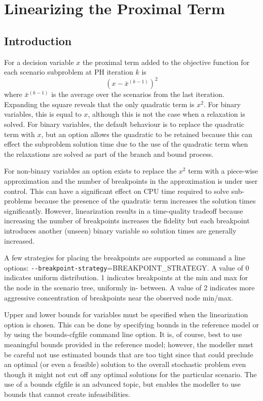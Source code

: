 \section{Linearizing the Proximal Term \label{LinearSec}}

\subsection{Introduction}

For a decision variable $x$ the proximal term added to the objective function for each scenario subproblem at PH iteration $k$ is
$$
\left(x - \bar{x}^{(k-1)}\right)^{2}
$$
where $\bar{x}^{(k-1)}$ is the average over the scenarios from the last iteration. Expanding the square reveals that the only
quadratic term is $x^{2}$. For binary variables, this is equal to $x$, although this is not the case when a relaxation is solved.
For binary variables, the default behaviour is to replace the quadratic term with $x$, but an option allows the quadratic to be
retained because this can effect the subproblem solution time due to the use of the quadratic term when the relaxations are solved
as part of the branch and bound process.

For non-binary variables an option exists to replace the $x^2$ term with a piece-wise approximation and the number of breakpoints in the
approximation is under user control. This can have a significant effect on CPU time required to solve sub-problems because the presence of
the quadratic term increases the solution times significantly. However, linearization results in a time-quality tradeoff because increasing
the number of breakpoints increases the fidelity but each breakpoint introduces another (unseen) binary variable so solution times are generally
increased.

A few strategies for placing the breakpoints are supported as command a line options: 
\verb|--breakpoint-strategy|=BREAKPOINT\_STRATEGY. A value of 0
indicates uniform distribution. 1 indicates
breakpoints at the min and max for the node in the scenario tree, uniformly in-
between. A value of 2 indicates more aggressive concentration of
breakpoints near the observed node min/max.

Upper and lower bounds for variables must be specified when the linearization option is chosen. This can be done by specifying bounds in the
reference model or by using the bounds-cfgfile command line option. It is, of course, best to use meaningful bounds provided
in the reference model; however, the modeller must be careful not use estimated bounds that are too tight since that could preclude
an optimal (or even a feasible) solution to the overall stochastic problem even though it might not cut off any optimal solutions for the
particular scenario. The use of a bounds cfgfile is an advanced topic, but enables the modeller to use bounds that cannot create
infeasibilities.

